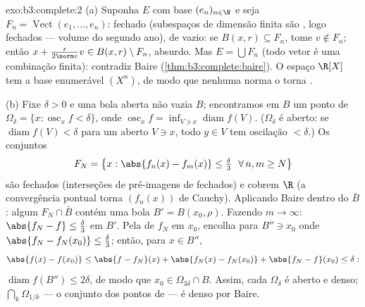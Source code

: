 \begin{solution}{exo:b3:complete:2}
(a) Suponha $E$  com base  $(e_n)_{n\in\N}$
e seja $F_n = \operatorname{Vect}(e_1, \dots, e_n)$: fechado
(subespaços de dimensão finita são , logo fechados ---
volume do segundo ano), de  vazio: se $B(x, r) \subseteq F_n$, tome
$v \notin F_n$; então $x + \frac{r}{2\norm v}v \in B(x,r)
\setminus F_n$, absurdo. Mas $E = \bigcup F_n$ (todo vetor é
uma combinação finita): contradiz Baire
(\cref{thm:b3:complete:baire}). O espaço $\R[X]$ tem a
base enumerável $(X^n)$, de modo que nenhuma norma o torna .

(b) Fixe $\delta > 0$ e uma bola aberta não vazia $B$; encontramos em
$B$ um ponto de $\Omega_\delta = \{x : \operatorname{osc}_xf <
\delta\}$, onde $\operatorname{osc}_xf = \inf_{V \ni
x}\operatorname{diam} f(V)$. ($\Omega_\delta$ é aberto: se
$\operatorname{diam}f(V) < \delta$ para um aberto $V \ni x$, todo
$y \in V$ tem oscilação $< \delta$.) Os conjuntos
\[
F_N = \bigl\{x : \abs{f_n(x) - f_m(x)} \leq \tfrac\delta3\
\ \forall\, n, m \geq N \bigr\}
\]
são fechados (interseções de pré-imagens de fechados) e
cobrem $\R$ (a convergência pontual torna $(f_n(x))$ de Cauchy).
Aplicando Baire dentro do  $\bar B$: algum $F_N \cap
\bar B$ contém uma bola $B' = B(x_0, \rho)$. Fazendo $m \to
\infty$: $\abs{f_N - f} \leq \frac\delta3$ em $B'$. Pela
 de $f_N$ em $x_0$, encolha para $B'' \ni x_0$ onde
$\abs{f_N - f_N(x_0)} \leq \frac\delta3$; então, para $x \in B''$,
\[
\abs{f(x) - f(x_0)} \leq \abs{f - f_N}(x) + \abs{f_N(x) -
f_N(x_0)} + \abs{f_N - f}(x_0) \leq \delta:
\]
$\operatorname{diam} f(B'') \leq 2\delta$, de modo que $x_0 \in
\Omega_{3\delta} \cap B$. Assim, cada $\Omega_\delta$ é aberto e
denso; $\bigcap_k\Omega_{1/k}$ --- o conjunto dos pontos de 
--- é denso por Baire.
\end{solution}

